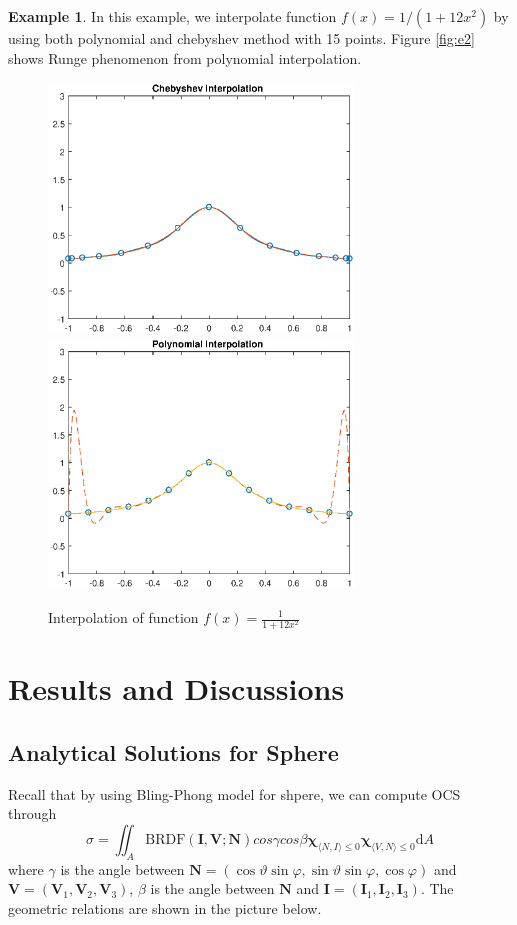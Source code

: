 \documentclass[11pt]{amsart}
\newcommand{\BRDF}{\mathrm{BRDF}}
\newcommand{\ip}[2]{\langle {#1}, {#2} \rangle}
\theoremstyle{definition}
\newtheorem{exmp}{Example}[section]
\begin{document}
\begin{exmp}
In this example, we interpolate function $f(x)=1/(1+12x^2)$ by using both polynomial and chebyshev method with 15 points. Figure \eqref{fig:e2} shows Runge phenomenon from polynomial interpolation.\\
\begin{figure}     	\centerline{\includegraphics[width=3.2in]{./figs/e2a.eps}
      	\hspace{-6pt}
     	\includegraphics[width=3.2in]{./figs/e2b.eps}}
     	\hspace{-6pt}
		\caption{Interpolation of function $f(x)=\frac{1}{1+12x^2}$}
        \label{fig:e2}
\end{figure}
\end{exmp}

\section{Results and Discussions}
\subsection{Analytical Solutions for Sphere}
Recall that by using Bling-Phong model for shpere, we can compute OCS through
$$\sigma =\iint_{A}\BRDF(\mathbf{I},\mathbf{V};\mathbf{N}) cos\gamma cos\beta \mathbf{\chi}_{\ip{N}{I}\leq 0}\mathbf{\chi}_{\ip{V}{N}\leq 0}\mathrm{d}A$$
where $\gamma$ is the angle between $\mathbf{N}=(\cos\vartheta\sin\varphi,\sin\vartheta\sin\varphi,\cos\varphi)$ and  $\mathbf{V}=(\mathbf{V}_1,\mathbf{V}_2,\mathbf{V}_3)$,  $\beta$ is the angle between $\mathbf{N}$ and $\mathbf{I}=(\mathbf{I}_1,\mathbf{I}_2,\mathbf{I}_3)$. The geometric relations are shown in the picture below.
\end{document}
